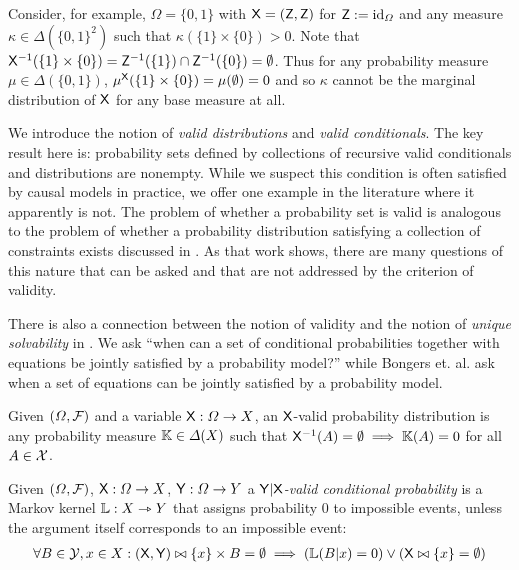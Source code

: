 Consider, for example, $\Omega=\{0,1\}$ with $\mathsf{X}=(\mathsf{Z},\mathsf{Z})$ for $\mathsf{Z}:=\text{id}_{\Omega}$ and any measure $\kappa\in \Delta(\{0,1\}^2)$ such that $\kappa(\{1\}\times \{0\})>0$. Note that $\mathsf{X}^{-1}(\{1\}\times \{0\})=\mathsf{Z}^{-1}(\{1\})\cap \mathsf{Z}^{-1}(\{0\})=\emptyset$. Thus for any probability measure $\mu\in \Delta(\{0,1\})$, $\mu^{\mathsf{X}}(\{1\}\times \{0\}) = \mu(\emptyset)=0 $ and so $\kappa$ cannot be the marginal distribution of $\mathsf{X}$ for any base measure at all.

We introduce the notion of \emph{valid distributions} and \emph{valid conditionals}. The key result here is: probability sets defined by collections of recursive valid conditionals and distributions are nonempty. While we suspect this condition is often satisfied by causal models in practice, we offer one example in the literature where it apparently is not. The problem of whether a probability set is valid is analogous to the problem of whether a probability distribution satisfying a collection of constraints exists discussed in \citet{vorobev_consistent_1962}. As that work shows, there are many questions of this nature that can be asked and that are not addressed by the criterion of validity.

There is also a connection between the notion of validity and the notion of \emph{unique solvability} in \citet{bongers_theoretical_2016}. We ask ``when can a set of conditional probabilities together with equations be jointly satisfied by a probability model?'' while Bongers et. al. ask when a set of equations can be jointly satisfied by a probability model.

\begin{definition}\label{def:valid_dist}
Given $(\Omega,\mathcal{F})$ and a variable $\mathsf{X}:\Omega\to X$, an $\mathsf{X}$-valid probability distribution is any probability measure $\mathbb{K}\in \Delta(X)$ such that $\mathsf{X}^{-1}(A)=\emptyset\implies \mathbb{K}(A) = 0$ for all $A\in\mathcal{X}$.
\end{definition}

\begin{definition}\label{def:valid_conditional_prob}
Given $(\Omega,\mathcal{F})$, $\mathsf{X}:\Omega\to X$, $\mathsf{Y}:\Omega\to Y$ a \emph{$\mathsf{Y}|\mathsf{X}$-valid conditional probability} is a Markov kernel $\mathbb{L}:X\rightarrowtriangle Y$ that assigns probability 0 to impossible events, unless the argument itself corresponds to an impossible event:
\begin{align}
    \forall B\in \mathcal{Y}, x\in X: (\mathsf{X},\mathsf{Y})\bowtie \{x\}\times B = \emptyset \implies \left(\mathbb{L}(B|x) = 0\right) \lor \left(\mathsf{X}\bowtie \{x\} = \emptyset\right)
\end{align}
\end{definition}


